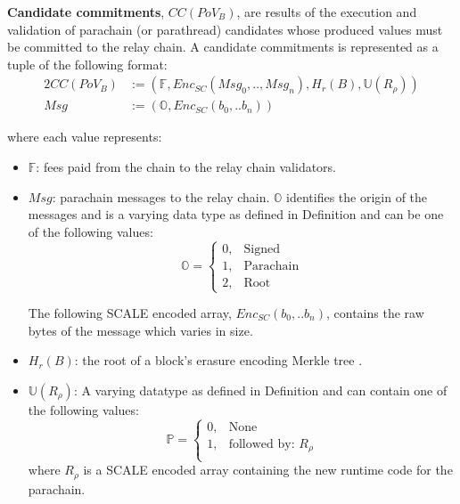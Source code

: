 \begin{definition}
  \label{defn-candidate-commitments}
  \textbf{Candidate commitments}, $CC(PoV_B)$, are results of the execution and validation of
  parachain (or parathread) candidates whose produced values must be committed
  to the relay chain. A candidate commitments is represented as a tuple of the following format:
  \begin{alignat*}{2}
    CC(PoV_B) &:= (\mathbb{F}, Enc_{SC}(Msg_0, .., Msg_n), H_r(B), \mathbb{U}(R_\rho)) \\
    Msg &:= (\mathbb{O}, Enc_{SC}(b_0,.. b_n))
  \end{alignat*}

  where each value represents:
  \begin{itemize}
    \item $\mathbb{F}$: fees paid from the chain to the relay chain validators.
    \item $Msg$: parachain messages to the relay chain. $\mathbb{O}$ identifies
    the origin of the messages and is a varying data type as defined in
    Definition  and can be one of the following values:
    \begin{equation*}
      \mathbb{O} =
      \begin{cases}
        0, & \text{Signed} \\
        1, & \text{Parachain} \\
        2, & \text{Root}
      \end{cases}
    \end{equation*}

    The following SCALE encoded array, $Enc_{SC}(b_0,.. b_n)$, contains the
    raw bytes of the message which varies in size.
    \item $H_r(B)$: the root of a block's erasure encoding Merkle tree
    .
    \item $\mathbb{U}(R_\rho)$: A varying datatype as defined in Definition
     and can contain one of the following values:
    \begin{equation*}
      \mathbb{P} =
      \begin{cases}
        0, & \text{None} \\
        1, & \text{followed by: } R_\rho\\
      \end{cases}
    \end{equation*}
    where $R_\rho$ is a SCALE encoded array containing the new runtime code for
    the parachain. 
  \end{itemize}
  
\end{definition}


